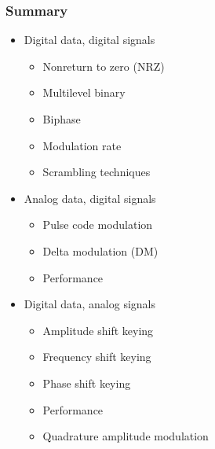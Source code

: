 \documentclass[pdflatex,compress]{beamer}
\begin{document}
\begin{frame}
	\frametitle{Summary}
	\begin{multicols}{2}
		\begin{itemize}
			\item Digital data, digital signals
			\begin{itemize}
				\item Nonreturn to zero (NRZ)
				\item Multilevel binary
				\item Biphase
				\item Modulation rate
				\item Scrambling techniques
			\end{itemize}
			\item Analog data, digital signals
			\begin{itemize}
				\item Pulse code modulation
				\item Delta modulation (DM)
				\item Performance
			\end{itemize}
			\columnbreak
			\item Digital data, analog signals
			\begin{itemize}
				\item Amplitude shift keying
				\item Frequency shift keying
				\item Phase shift keying
				\item Performance
				\item Quadrature amplitude modulation
			\end{itemize}
		\vfill\null
		\end{itemize}
	\end{multicols}
\end{frame}

\end{document}
